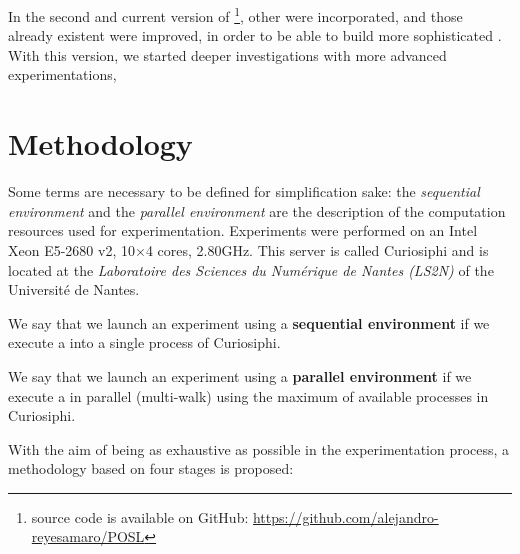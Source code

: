 In the second and current version of \posl{}\footnote{\posl{} source code is available on GitHub: \href{https://github.com/alejandro-reyesamaro/POSL}{https://github.com/alejandro-reyesamaro/POSL}}, other \commopers{} were incorporated, and those already existent were improved, in order to be able to build more sophisticated \commstrs. With this version, we started deeper investigations with more advanced experimentations,  

\section{Methodology}

Some terms are necessary to be defined for simplification sake: the \textit{sequential environment} and the \textit{parallel environment} are the description of the computation resources used for experimentation. Experiments were performed on an Intel\R{} Xeon\TM{} E5-2680 v2, 10$\times$4 cores, 2.80GHz. This server is called {\sc Curiosiphi} and is located at the  \textit{Laboratoire des Sciences du Numérique de Nantes (LS2N)} of the Université de Nantes. %

\begin{definition}\label{def:seq_envir}
We say that we launch an experiment using a \textbf{sequential environment} if we execute a \soset{} into a single process of {\sc Curiosiphi}.
\end{definition}

\begin{definition}\label{def:par_envir}
We say that we launch an experiment using a \textbf{parallel environment} if we execute a \soset{} in parallel (multi-walk) using the maximum of available processes in {\sc Curiosiphi}.
\end{definition}


With the aim of being as exhaustive as possible in the experimentation process, a methodology based on four stages is proposed:

